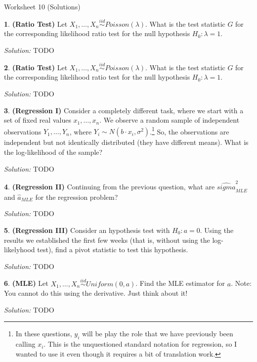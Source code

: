 \documentclass{tufte-handout}
\newcommand{\iid}{\stackrel{iid}{\sim}}
\begin{document}
\justify

{\LARGE Worksheet 10 (Solutions)}

\vspace*{18pt}


\textbf{1}. \textbf{(Ratio Test)} Let $X_1, \ldots, X_n \iid Poisson(\lambda)$.
What is the test statistic $G$ for the corresponding likelihood 
ratio test for the null hypothesis $H_0: \lambda = 1$.

\textit{Solution:} TODO

\textbf{2}. \textbf{(Ratio Test)} Let $X_1, \ldots, X_n \iid Poisson(\lambda)$.
What is the test statistic $G$ for the corresponding likelihood 
ratio test for the null hypothesis $H_0: \lambda = 1$.

\textit{Solution:} TODO

\textbf{3}. \textbf{(Regression I)} Consider a completely different task, where we start
with a set of fixed real values $x_1, \ldots, x_n$. We observe a random
sample of independent observations $Y_1, \ldots, Y_n$, where
$Y_i \sim N(b \cdot x_i, \sigma^2)$.\footnote{
  In these questions, $y_i$ will be play the role that we have previously
  been calling $x_i$. This is the unquestioned standard notation for regression,
  so I wanted to use it even though it requires a bit of translation work.
} So, the observations are independent but not identically distributed (they
have different means). What is the log-likelihood of the sample?

\textit{Solution:} TODO

\textbf{4}. \textbf{(Regression II)} Continuing from the previous question, what are
$\hat{sigma}_{MLE}^2$ and $\hat{a}_{MLE}$ for the regression problem?

\textit{Solution:} TODO

\textbf{5}. \textbf{(Regression III)} Consider an hypothesis test with $H_0: a = 0$. 
Using the results we established the first few weeks (that is, without using the
log-likelyhood test), find a pivot statistic to test this hypothesis. 

\textit{Solution:} TODO

\textbf{6}. \textbf{(MLE)} Let $X_1, \ldots, X_n \iid Uniform(0, a)$. Find the MLE estimator
for $a$. Note: You cannot do this using the derivative. Just think about it!

\textit{Solution:} TODO
\end{document}
